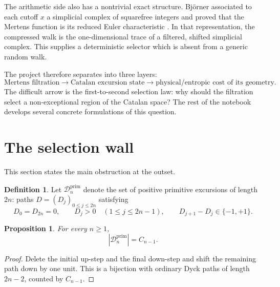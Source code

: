 \documentclass[11pt]{amsart}
\numberwithin{equation}{section}
\theoremstyle{plain}
\newtheorem{proposition}[theorem]{Proposition}
\theoremstyle{definition}
\newtheorem{definition}[theorem]{Definition}
\theoremstyle{remark}
\newcommand{\Cat}{C}
\newcommand{\D}{\mathcal{D}}
\begin{document}
The arithmetic side also has a nontrivial exact structure.  Bj\"orner associated to each cutoff $x$ a simplicial complex of squarefree integers and proved that the Mertens function is its reduced Euler characteristic \cite{Bjorner2011}.  In that representation, the compressed walk is the one-dimensional trace of a filtered, shifted simplicial complex.  This supplies a deterministic selector which is absent from a generic random walk.

The project therefore separates into three layers:
\begin{equation}
\text{Mertens filtration}
\longrightarrow
\text{Catalan excursion state}
\longrightarrow
\text{physical/entropic cost of its geometry}.
\label{eq:three_layer_program}
\end{equation}
The difficult arrow is the first-to-second selection law: why should the filtration select a non-exceptional region of the Catalan space?  The rest of the notebook develops several concrete formulations of this question.

\section{The selection wall}
\label{sec:selection_wall}

This section states the main obstruction at the outset.

\begin{definition}
\label{def:catalan_excursion_space}
Let $\D_n^{\mathrm{prim}}$ denote the set of positive primitive excursions of length $2n$: paths $D=(D_j)_{0\le j\le 2n}$ satisfying
\begin{equation}
D_0=D_{2n}=0,
\qquad
D_j>0 \quad (1\le j\le 2n-1),
\qquad
D_{j+1}-D_j\in\{-1,+1\}.
\label{eq:primitive_dyck_definition}
\end{equation}
\end{definition}

\begin{proposition}
\label{prop:primitive_catalan_cardinality}
For every $n\ge1$,
\begin{equation}
\left|\D_n^{\mathrm{prim}}\right|=\Cat_{n-1}.
\label{eq:primitive_catalan_cardinality}
\end{equation}
\end{proposition}

\begin{proof}
Delete the initial up-step and the final down-step and shift the remaining path down by one unit.  This is a bijection with ordinary Dyck paths of length $2n-2$, counted by $\Cat_{n-1}$.
\end{proof}
\end{document}
